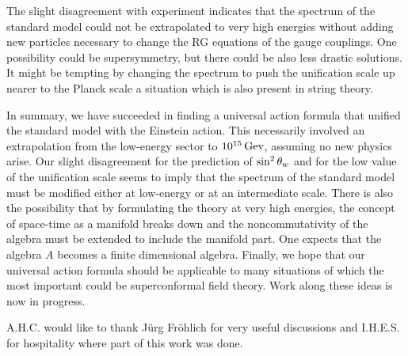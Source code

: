 The slight disagreement with experiment
indicates that the spectrum of the standard model could
not be extrapolated to very high energies without adding
new particles necessary to change the RG equations of the
gauge couplings. One possibility could be supersymmetry,
but there could be also less drastic solutions. It might
be tempting by changing the spectrum to push the unification
scale up nearer to the Planck scale a situation
which is also present in string theory.

In summary, we have succeeded in finding a universal
action formula that unified the standard model with the
Einstein action. This necessarily involved an
extrapolation from the low-energy sector to $10^{15} \mathop{\rm Gev}\nolimits$,
assuming no new physics arise. Our slight disagreement for the
prediction of $\sin^2 \theta_w$ and for the low value of the
unification scale seems to imply that the spectrum of the
standard model must be modified either at low-energy or at an
intermediate scale. There is also the possibility that by
formulating the theory at very high energies, the concept of
space-time as a manifold breaks down and the
noncommutativity of the algebra must be extended to include
the manifold part. One expects that the algebra $A$ becomes
a finite dimensional algebra. Finally, we hope that our
universal action formula should be applicable to many
situations of which the most important could be
superconformal field theory. Work along these ideas is now in
progress.

\vglue 1cm

 A.H.C. would like to
thank J\"urg Fr\"ohlich for very useful discussions and
I.H.E.S. for hospitality where part of this work was done.

\vfill\eject


\medskip

